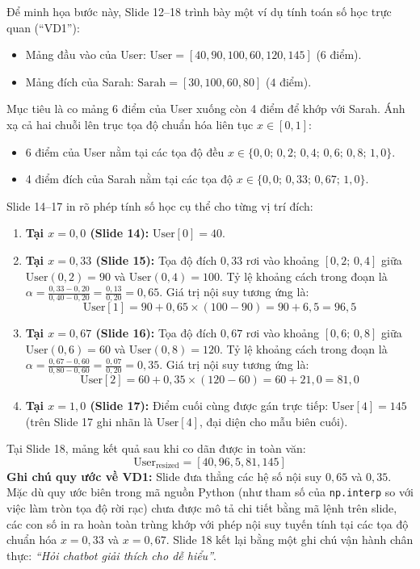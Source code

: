 \documentclass[11pt,a4paper]{article}
\begin{document}
Để minh họa bước này, Slide 12--18 trình bày một ví dụ tính toán số học trực quan (``VD1''):
\begin{itemize}
    \item Mảng đầu vào của User: $\text{User} = [40, 90, 100, 60, 120, 145]$ ($6$ điểm).
    \item Mảng đích của Sarah: $\text{Sarah} = [30, 100, 60, 80]$ ($4$ điểm).
\end{itemize}
Mục tiêu là co mảng 6 điểm của User xuống còn 4 điểm để khớp với Sarah. Ánh xạ cả hai chuỗi lên trục tọa độ chuẩn hóa liên tục $x \in [0, 1]$:
\begin{itemize}
    \item 6 điểm của User nằm tại các tọa độ đều $x \in \{0{,}0;\, 0{,}2;\, 0{,}4;\, 0{,}6;\, 0{,}8;\, 1{,}0\}$.
    \item 4 điểm đích của Sarah nằm tại các tọa độ $x \in \{0{,}0;\, 0{,}33;\, 0{,}67;\, 1{,}0\}$.
\end{itemize}
Slide 14--17 in rõ phép tính số học cụ thể cho từng vị trí đích:
\begin{enumerate}
    \item \textbf{Tại $x = 0{,}0$ (Slide 14):} $\text{User}[0] = 40$.
    \item \textbf{Tại $x = 0{,}33$ (Slide 15):} Tọa độ đích $0{,}33$ rơi vào khoảng $[0{,}2;\, 0{,}4]$ giữa $\text{User}(0{,}2) = 90$ và $\text{User}(0{,}4) = 100$. Tỷ lệ khoảng cách trong đoạn là $\alpha = \frac{0{,}33 - 0{,}20}{0{,}40 - 0{,}20} = \frac{0{,}13}{0{,}20} = 0{,}65$. Giá trị nội suy tương ứng là:
    \begin{equation}
    \text{User}[1] = 90 + 0{,}65 \times (100 - 90) = 90 + 6{,}5 = 96{,}5
    \end{equation}
    \item \textbf{Tại $x = 0{,}67$ (Slide 16):} Tọa độ đích $0{,}67$ rơi vào khoảng $[0{,}6;\, 0{,}8]$ giữa $\text{User}(0{,}6) = 60$ và $\text{User}(0{,}8) = 120$. Tỷ lệ khoảng cách trong đoạn là $\alpha = \frac{0{,}67 - 0{,}60}{0{,}80 - 0{,}60} = \frac{0{,}07}{0{,}20} = 0{,}35$. Giá trị nội suy tương ứng là:
    \begin{equation}
    \text{User}[2] = 60 + 0{,}35 \times (120 - 60) = 60 + 21{,}0 = 81{,}0
    \end{equation}
    \item \textbf{Tại $x = 1{,}0$ (Slide 17):} Điểm cuối cùng được gán trực tiếp: $\text{User}[4] = 145$ (trên Slide 17 ghi nhãn là $\text{User}[4]$, đại diện cho mẫu biên cuối).
\end{enumerate}
Tại Slide 18, mảng kết quả sau khi co dãn được in toàn văn:
\begin{equation}
\text{User}_{\text{resized}} = [40, 96{,}5, 81, 145]
\end{equation}
\textbf{Ghi chú quy ước về VD1:} Slide đưa thẳng các hệ số nội suy $0{,}65$ và $0{,}35$. Mặc dù quy ước biên trong mã nguồn Python (như tham số của \texttt{np.interp} so với việc làm tròn tọa độ rời rạc) chưa được mô tả chi tiết bằng mã lệnh trên slide, các con số in ra hoàn toàn trùng khớp với phép nội suy tuyến tính tại các tọa độ chuẩn hóa $x = 0{,}33$ và $x = 0{,}67$. Slide 18 kết lại bằng một ghi chú vận hành chân thực: \textit{``Hỏi chatbot giải thích cho dễ hiểu''}.
\end{document}
